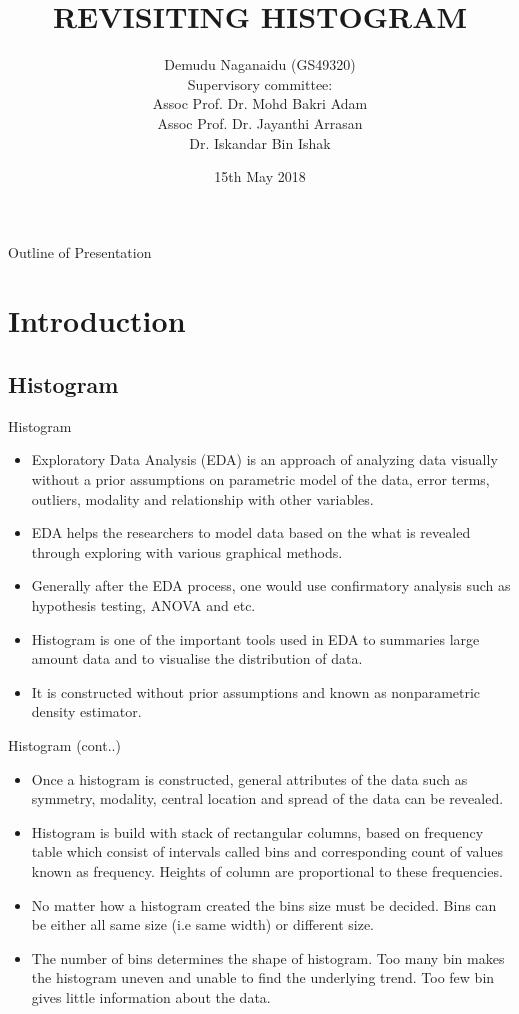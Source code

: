 \documentclass{beamer}
\title{REVISITING HISTOGRAM}
\author
{Demudu Naganaidu (GS49320) \\
Supervisory committee: \\
Assoc Prof. Dr. Mohd Bakri Adam \\
Assoc Prof. Dr. Jayanthi Arrasan \\
Dr. Iskandar Bin Ishak }
\institute{Institute of Mathematical Research \\
University Putra Malaysia}
\date{15th May 2018}
\begin{document}
\begin{frame}
  \titlepage
\end{frame}

\begin{frame}{Outline of Presentation}
  \tableofcontents
\end{frame}

\section{Introduction}
\subsection{Histogram}
\begin{frame}{Histogram}
\begin{itemize}
	\item Exploratory Data Analysis (EDA) is an approach of analyzing data visually without a prior assumptions on parametric model of the data, error terms, outliers, modality and relationship with other variables.
	\item EDA helps the researchers to model data based on the what is revealed through exploring with various graphical methods. \item Generally after the EDA process, one would use confirmatory analysis such as hypothesis testing, ANOVA and etc.
	\item Histogram is one of the important tools used in EDA to summaries large amount data and to visualise the distribution of data.
	\item It is constructed without prior assumptions and known as nonparametric density estimator.
	
\end{itemize}
\end{frame}

\begin{frame}{Histogram (cont..)}
\begin{itemize}
		\item Once a histogram is constructed, general attributes of the data such as symmetry, modality, central location and spread of the data can be revealed.
		\item Histogram is build with stack of rectangular columns, based on frequency table which consist of intervals called bins and corresponding count of values known as frequency. Heights of column are  proportional to these frequencies.
		\item No matter how a histogram created the bins size must be decided. Bins can be either all same size (i.e same width) or different size.
		\item The number of bins determines the shape of histogram. Too many bin makes the histogram uneven and unable to find the underlying trend. Too few bin gives little information about the data.
\end{itemize}

\end{frame}
	
\end{document}
